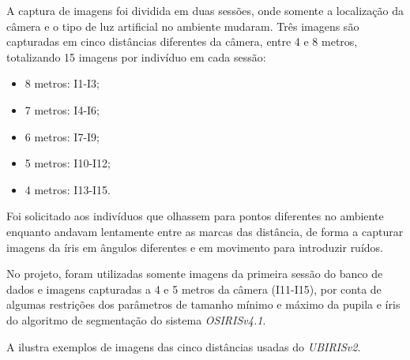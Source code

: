 \par A captura de imagens foi dividida em duas sessões, onde somente a localização da câmera e o tipo de luz artificial no ambiente mudaram. Três imagens são capturadas em cinco distâncias diferentes da câmera, entre 4 e 8 metros, totalizando 15 imagens por indivíduo em cada sessão: 

\begin{itemize}
    \item 8 metros: I1-I3;
    \item 7 metros: I4-I6;
    \item 6 metros: I7-I9;
    \item 5 metros: I10-I12;
    \item 4 metros: I13-I15.
\end{itemize}

\par Foi solicitado aos indivíduos que olhassem para pontos diferentes no ambiente enquanto andavam lentamente entre as marcas das distância, de forma a capturar imagens da íris em ângulos diferentes e em movimento para introduzir ruídos.

\par No projeto, foram utilizadas somente imagens da primeira sessão do banco de dados e imagens capturadas a 4 e 5 metros da câmera (I11-I15), por conta de algumas restrições dos parâmetros de tamanho mínimo e máximo da pupila e íris do algoritmo de segmentação do sistema \textit{OSIRISv4.1}.

\par A  ilustra exemplos de imagens das cinco distâncias usadas do \textit{UBIRISv2}.

